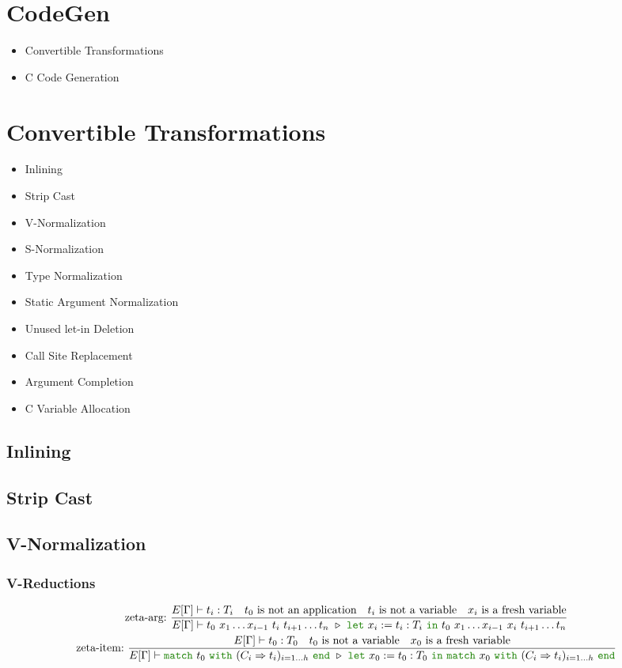 \documentclass[a4paper,fleqn]{article}
\newcommand{\kwlet}{\mbox{\color{mygreen}\ttfamily let}}
\newcommand{\kwin}{\mbox{\color{mygreen}\ttfamily in}}
\newcommand{\kwmatch}{\mbox{\color{mygreen}\ttfamily match}}
\newcommand{\kwwith}{\mbox{\color{mygreen}\ttfamily with}}
\newcommand{\kwend}{\mbox{\color{mygreen}\ttfamily end}}
\newcommand{\letin}[3]{\kwlet~#1:=#2~\kwin~#3}
\newcommand{\match}[4]{\kwmatch~#1~\kwwith~(#2 \Rightarrow #3)_{#4}~\kwend}
\begin{document}
\section{CodeGen}\label{sec:codegen}

\begin{itemize}
\item Convertible Transformations
\item C Code Generation
\end{itemize}

\section{Convertible Transformations}\label{sec:convertible-transformations}

\begin{itemize}
\item Inlining
\item Strip Cast
\item V-Normalization
\item S-Normalization
\item Type Normalization
\item Static Argument Normalization
\item Unused let-in Deletion
\item Call Site Replacement
\item Argument Completion
\item C Variable Allocation
\end{itemize}

\subsection{Inlining}\label{sec:inlining}
\subsection{Strip Cast}\label{sec:strip-cast}
\subsection{V-Normalization}\label{sec:v-normalization}
\subsubsection{V-Reductions}\label{sec:v-reductions}
\begin{gather*}
  \text{zeta-arg:}~
    \dfrac
    {
      E[\Gamma] \vdash t_i : T_i \quad
      \text{$t_0$ is not an application} \quad
      \text{$t_i$ is not a variable} \quad
      \text{$x_i$ is a fresh variable}
    }{
      E[\Gamma] \vdash
      t_0~x_1 \ldots x_{i-1}~t_i~t_{i+1} \ldots t_n
      ~\triangleright~
      \letin{x_i}{t_i:T_i}{t_0~x_1 \ldots x_{i-1}~x_i~t_{i+1} \ldots t_n}
    } \\
  \text{zeta-item:}~
    \dfrac
    {
      E[\Gamma] \vdash t_0 : T_0 \quad
      \text{$t_0$ is not a variable} \quad
      \text{$x_0$ is a fresh variable}
    }{
      E[\Gamma] \vdash
      \match{t_0}{C_i}{t_i}{i=1\dots h}
      ~\triangleright~
      \letin{x_0}{t_0:T_0}{\match{x_0}{C_i}{t_i}{i=1\dots h}}
    }
\end{gather*}
\end{document}
